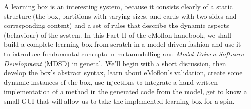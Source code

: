 A learning box is an interesting system, because it consists clearly of a static structure (the box, partitions with varying sizes, and cards with two sides and
corresponding content) and a set of rules that describe the dynamic aspects (behaviour) of the system. In this Part II of the eMoflon handbook, we shall build a 
complete learning box from scratch in a model-driven fashion and use it to introduce fundamental concepts in metamodelling and \emph{Model-Driven Software 
Development} (MDSD) in general. We'll begin with a short discussion, then develop the box's abstract syntax, learn about eMoflon's validation, create
some dynamic instances of the box, use injections to integrate a hand-written implementation of a method in the generated code from the model, get to know a
small GUI that will allow us to take the implemented learning box for a spin.
